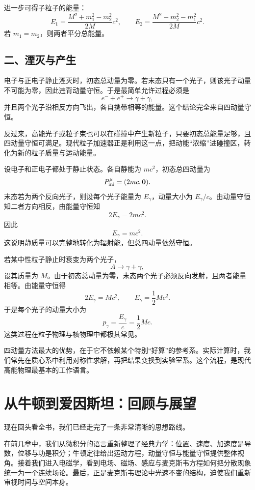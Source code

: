 进一步可得子粒子的能量：
\[
E_1 = \frac{M^2+m_1^2-m_2^2}{2M}c^2,
\qquad
E_2 = \frac{M^2+m_2^2-m_1^2}{2M}c^2.
\]
若 $m_1=m_2$，则两者平分总能量。

\subsection*{二、湮灭与产生}

电子与正电子静止湮灭时，初态总动量为零。若末态只有一个光子，则该光子动量不可能为零，因此违背动量守恒。于是最简单允许过程必须是
\[
e^-+e^+\to \gamma+\gamma,
\]
并且两个光子沿相反方向飞出，各自携带相等的能量。这个结论完全来自四动量守恒。

反过来，高能光子或粒子束也可以在碰撞中产生新粒子，只要初态总能量足够，且四动量守恒可满足。现代粒子加速器正是利用这一点，把动能“浓缩”进碰撞区，转化为新的粒子质量与运动能量。

\begin{example}
设电子和正电子都处于静止状态。各自静能为 $mc^2$，初态总四动量为
\[
P_{\text{ini}}^\mu = (2mc,\vb{0}).
\]
末态若为两个反向光子，则设每个光子能量为 $E_\gamma$，动量大小为 $E_\gamma/c$。由动量守恒知二者方向相反，由能量守恒知
\[
2E_\gamma = 2mc^2.
\]
因此
\[
E_\gamma = mc^2.
\]
这说明静质量可以完整地转化为辐射能，但总四动量依然守恒。
\end{example}

\begin{example}[母粒子静止系中的双光子衰变]
若某中性粒子静止时衰变为两个光子，
\[
A\to \gamma+\gamma,
\]
设其质量为 $M$。由于初态总动量为零，末态两个光子必须反向发射，且两者能量相等。由能量守恒得
\[
2E_\gamma = Mc^2,
\qquad
E_\gamma = \frac12 Mc^2.
\]
于是每个光子的动量大小为
\[
p_\gamma = \frac{E_\gamma}{c}=\frac12 Mc.
\]
这类过程在粒子物理与核物理中都极其常见。
\end{example}

\begin{remark}
四动量方法最大的优势，在于它不依赖某个特别“好算”的参考系。实际计算时，我们常先在质心系中利用对称性求解，再把结果变换到实验室系。这个流程，是现代高能物理最基本的工作语言。
\end{remark}

\section{从牛顿到爱因斯坦：回顾与展望}

现在回头看全书，我们已经走完了一条非常清晰的思想路线。

在前几章中，我们从微积分的语言重新整理了经典力学：位置、速度、加速度是导数，位移与功是积分；牛顿定律给出运动方程，动量守恒与能量守恒提供整体视角。接着我们进入电磁学，看到电场、磁场、感应与麦克斯韦方程如何把分散现象统一为一个连续场论。最后，正是麦克斯韦理论中光速不变的结构，迫使我们重新审视时间与空间本身。

